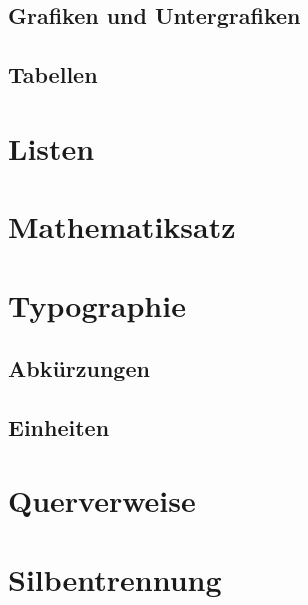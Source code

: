 \documentclass[%
  english,ngerman,%
  geometry=no,DIV=12,automark,%
]{tudscrartcl}
\begin{document}
\subsection{Grafiken und Untergrafiken}
\label{sec:graphics}


\subsection{Tabellen}
\label{sec:tables}


\section{Listen}


\section{Mathematiksatz}


\section{Typographie}

\subsection{Abkürzungen}

\subsection{Einheiten}


\section{Querverweise}


\section{Silbentrennung}
\end{document}
